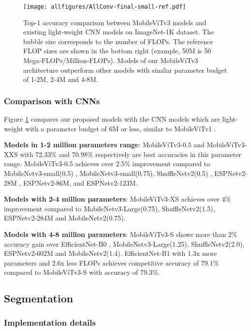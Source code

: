 \documentclass{article} \usepackage{iclr2022_conference,times}
\begin{document}
\begin{figure}[t]
\begin{center}
\texttt{[image: allfigures/AllConv-final-small-ref.pdf]}
\end{center}
\caption{Top-1 accuracy comparison between MobileViTv3 models and existing light-weight CNN models on ImageNet-1K dataset. The bubble size corresponds to the number of FLOPs. The reference FLOP sizes are shown in the bottom right (example, 50M is 50 Mega-FLOPs/Million-FLOPs). Models of our MobileViTv3 architecture outperform other models with similar parameter budget of 1-2M, 2-4M and 4-8M.}
\label{fig:comp_cnn}
\end{figure}

\subsubsection{Comparison with CNNs}
Figure \ref{fig:comp_cnn} compares our proposed models with the CNN models which are light-weight with a parameter budget of 6M or less, similar to MobileViTv1 \citep{mehta2021mobilevit}. 

\textbf{Models in 1-2 million parameters range}:
MobileViTv3-0.5 and MobileViTv3-XXS with 72.33\% and 70.98\% respectively are best accuracies in this parameter range.
MobileViTv3-0.5 achieves over 2.5\% improvement compared to MobileNetv3-small(0.5) \citep{howard2019searching}, MobileNetv3-small(0.75), ShuffleNetv2(0.5) \citep{ma2018shufflenet}, ESPNetv2-28M \citep{mehta2019espnetv2}, ESPNetv2-86M, and ESPNetv2-123M. 

\textbf{Models with 2-4 million parameters}: MobileViTv3-XS achieves over 4\% improvement compared to MobileNetv3-Large(0.75), ShuffleNetv2(1.5), ESPNetv2-284M and MobileNetv2(0.75). 

\textbf{Models with 4-8 million parameters}: MobileViTv3-S shows more than 2\% accuracy gain over EfficientNet-B0 \citep{tan2019efficientnet},  MobileNetv3-Large(1.25), ShuffleNetv2(2.0), ESPNetv2-602M and  MobileNetv2(1.4). 
EfficientNet-B1 with 1.3x more parameters and 2.6x less FLOPs achieves competitive accuracy of 79.1\% compared to MobileViTv3-S with accuracy of 79.3\%.


\subsection{Segmentation} \label{results:seg}

\subsubsection{Implementation details}
\end{document}

